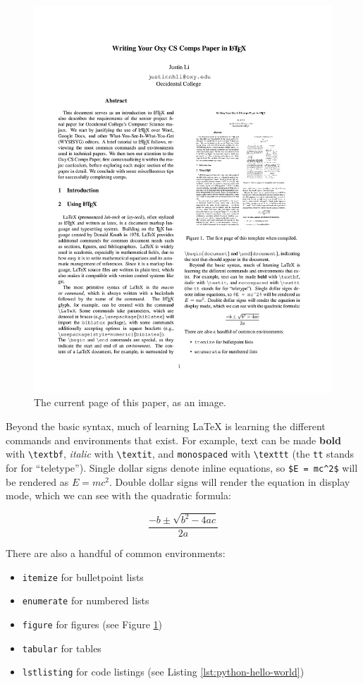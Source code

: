 \documentclass[10pt,twocolumn]{article}
\begin{document}
\begin{figure}
    \centering
    \includegraphics[width=.95\linewidth]{recursion.png}
    \caption{
        The current page of this paper, as an image.
    }
    \label{fig:first-page}
\end{figure}

Beyond the basic syntax, much of learning LaTeX is learning the different commands and environments that exist.
For example, text can be made \textbf{bold} with \texttt{\textbackslash textbf}, \textit{italic} with \texttt{\textbackslash textit}, and \texttt{monospaced} with \texttt{\textbackslash texttt} (the \texttt{tt} stands for for ``teletype'').
Single dollar signs denote inline equations, so \texttt{\$E = mc\textasciicircum 2\$} will be rendered as $E = mc^2$.
Double dollar signs will render the equation in display mode, which we can see with the quadratic formula:

$$\frac{{-b \pm \sqrt {b^2 - 4ac} }}{{2a}}$$

There are also a handful of common environments:

\begin{itemize}
    \item \texttt{itemize} for bulletpoint lists
    \item \texttt{enumerate} for numbered lists
    \item \texttt{figure} for figures (see Figure \ref{fig:first-page})
    \item \texttt{tabular} for tables
    \item \texttt{lstlisting} for code listings (see Listing \ref{lst:python-hello-world})
\end{itemize}
\end{document}
